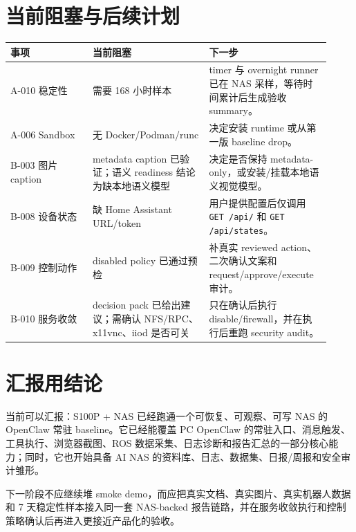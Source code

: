 \documentclass[UTF8,zihao=-4]{ctexart}
\begin{document}
\section{当前阻塞与后续计划}

\begin{longtable}{p{0.24\linewidth}p{0.34\linewidth}p{0.34\linewidth}}
\toprule
\rowcolor{tablehead}
事项 & 当前阻塞 & 下一步 \\
\midrule
A-010 稳定性 & 需要 168 小时样本 & timer 与 overnight runner 已在 NAS 采样，等待时间累计后生成验收 summary。 \\
A-006 Sandbox & 无 Docker/Podman/runc & 决定安装 runtime 或从第一版 baseline drop。 \\
B-003 图片 caption & metadata caption 已验证；语义 readiness 结论为缺本地语义模型 & 决定是否保持 metadata-only，或安装/挂载本地语义视觉模型。 \\
B-008 设备状态 & 缺 Home Assistant URL/token & 用户提供配置后仅调用 \texttt{GET /api/} 和 \texttt{GET /api/states}。 \\
B-009 控制动作 & disabled policy 已通过预检 & 补真实 reviewed action、二次确认文案和 request/approve/execute 审计。 \\
B-010 服务收敛 & decision pack 已给出建议；需确认 NFS/RPC、x11vnc、iiod 是否可关 & 只在确认后执行 disable/firewall，并在执行后重跑 security audit。 \\
\bottomrule
\end{longtable}

\section{汇报用结论}

当前可以汇报：S100P + NAS 已经跑通一个可恢复、可观察、可写 NAS 的 OpenClaw 常驻 baseline。它已经能覆盖 PC OpenClaw 的常驻入口、消息触发、工具执行、浏览器截图、ROS 数据采集、日志诊断和报告汇总的一部分核心能力；同时，它也开始具备 AI NAS 的资料库、日志、数据集、日报/周报和安全审计雏形。

下一阶段不应继续堆 smoke demo，而应把真实文档、真实图片、真实机器人数据和 7 天稳定性样本接入同一套 NAS-backed 报告链路，并在服务收敛执行和控制策略确认后再进入更接近产品化的验收。
\end{document}
